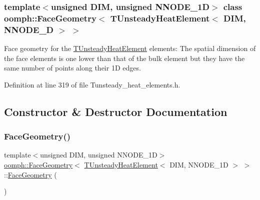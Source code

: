 \subsubsection*{template$<$unsigned D\+IM, unsigned N\+N\+O\+D\+E\+\_\+1D$>$\newline
class oomph\+::\+Face\+Geometry$<$ T\+Unsteady\+Heat\+Element$<$ D\+I\+M, N\+N\+O\+D\+E\+\_\+D $>$ $>$}

Face geometry for the \hyperlink{classoomph_1_1TUnsteadyHeatElement}{T\+Unsteady\+Heat\+Element} elements\+: The spatial dimension of the face elements is one lower than that of the bulk element but they have the same number of points along their 1D edges. 

Definition at line 319 of file Tunsteady\+\_\+heat\+\_\+elements.\+h.



\subsection{Constructor \& Destructor Documentation}
\mbox{\label{classoomph_1_1FaceGeometry_3_01TUnsteadyHeatElement_3_01DIM_00_01NNODE__1D_01_4_01_4_aaa769e2b78896380662b06975efd752e}} 
\subsubsection{\texorpdfstring{Face\+Geometry()}{FaceGeometry()}}
{\footnotesize\ttfamily template$<$unsigned D\+IM, unsigned N\+N\+O\+D\+E\+\_\+1D$>$ \\
\hyperlink{classoomph_1_1FaceGeometry}{oomph\+::\+Face\+Geometry}$<$ \hyperlink{classoomph_1_1TUnsteadyHeatElement}{T\+Unsteady\+Heat\+Element}$<$ D\+IM, N\+N\+O\+D\+E\+\_\+1D $>$ $>$\+::\hyperlink{classoomph_1_1FaceGeometry}{Face\+Geometry} (\begin{DoxyParamCaption}{ }\end{DoxyParamCaption})\hspace{0.3cm}{\ttfamily [inline]}}



